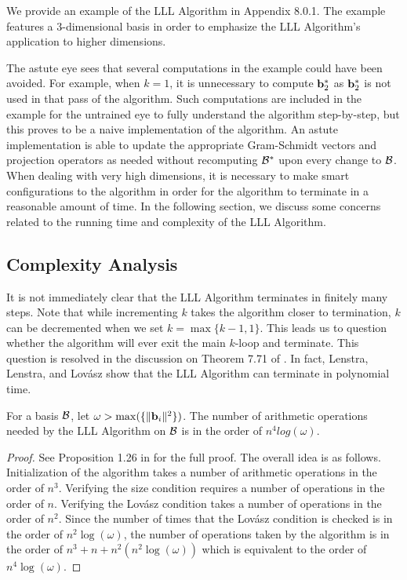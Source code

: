 \documentclass[a4paper,12pt]{article}
\begin{document}
We provide an example of the LLL Algorithm in Appendix 8.0.1. The example features a 3-dimensional basis in order to emphasize the LLL Algorithm's application to higher dimensions.

The astute eye sees that several computations in the example could have been avoided. For example, when $k=1$, it is unnecessary to compute $\mathbf{b}_2^*$ as $\mathbf{b}_2^*$ is not used in that pass of the algorithm. Such computations are included in the example for the untrained eye to fully understand the algorithm step-by-step, but this proves to be a naive implementation of the algorithm. An astute implementation is able to update the appropriate Gram-Schmidt vectors and projection operators as needed without recomputing $\mathcal{B}^*$ upon every change to $\mathcal{B}$. When dealing with very high dimensions, it is necessary to make smart configurations to the algorithm in order for the algorithm to terminate in a reasonable amount of time. In the following section, we discuss some concerns related to the running time and complexity of the LLL Algorithm.
\subsection{Complexity Analysis}
It is not immediately clear that the LLL Algorithm terminates in finitely many steps. Note that while incrementing $k$ takes the algorithm closer to termination, $k$ can be decremented when we set $k = \max\lbrace k-1, 1\rbrace$. This leads us to question whether the algorithm will ever exit the main $k$-loop and terminate. This question is resolved in the discussion on Theorem 7.71 of \cite{HPS}. In fact, Lenstra, Lenstra, and Lov\'asz show that the LLL Algorithm can terminate in polynomial time.
\begin{thm}
For a basis $\mathcal{B}$, let $\omega > \max(\lbrace\|\mathbf{b}_{i}\|^{2}\rbrace)$. The number of arithmetic operations needed by the LLL Algorithm on $\mathcal{B}$ is in the order of $n^{4}log(\omega)$.
\end{thm}

\begin{proof}   
See Proposition 1.26 in \cite{LLL} for the full proof. The overall idea is as follows. Initialization of the algorithm takes a number of arithmetic operations in the order of $n^3$. Verifying the size condition requires a number of operations in the order of $n$. Verifying the Lov\'asz condition takes a number of operations in the order of $n^2$. Since the number of times that the Lov\'asz condition is checked is in the order of $n^{2}\log(\omega)$, the number of operations taken by the algorithm is in the order of $n^{3} + n + n^{2}(n^{2}\log(\omega))$ which is equivalent to the order of $n^{4}\log(\omega)$.
\end{proof}
\end{document}
